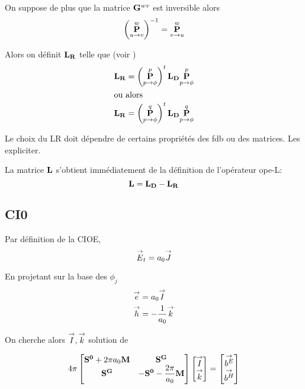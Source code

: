    \begin{prop}
      On suppose de plus que la matrice \(\mG{w}{v}\) est inversible alors
      \begin{equation}
        \left(\mP{u}{v}{w}\right)^{-1} = \mP{v}{u}{w}
      \end{equation}
    \end{prop}

    Alors on définit \(\mLR\) telle que (voir \cite{stupfel_implementation_2015})
    \begin{align}
      \mLR & = \left(\mP{p}{\phi}{p}\right)^t\mLD\mP{p}{\phi}{p} \\
      \intertext{ou alors}
      \mLR & = \left(\mP{p}{\phi}{q}\right)^t\mLD\mP{p}{\phi}{q} 
    \end{align}

    \begin{TODO}
      Le choix du LR doit dépendre de certains propriétés des fdb ou des matrices. Les expliciter.
    \end{TODO}

    La matrice \(\mL\) s’obtient immédiatement de la définition de l'opérateur \gls{ope-L}: 
    \begin{equation}
      \mL = \mLD - \mLR
    \end{equation}
        
    \subsection{CI0}
      Par définition de la CIOE,
      \begin{equation}
          \vE_t = a_0 \vJ
      \end{equation}

      En projetant sur la base des \(\phi_j\)
      \begin{align}
        \vect{e} &= a_0 \vect{I} \\
        \vect{h} &= -\frac{1}{a_0} \vect{k}
      \end{align}

    On cherche alors \(\vect{I},\vect{k}\) solution de 

    \begin{equation}
      4\pi
      \begin{bmatrix}
        \mat{S^0}+2\pi a_0 \mM & \mat{S^G} \\
        \mat{S^G} & -\mat{S^0} - \frac{2\pi}{a_0}\mM
      \end{bmatrix}
      \begin{bmatrix}
        \vect{I}\\
        \vect{k}
      \end{bmatrix}
      =
      \begin{bmatrix}
        \vect{b^E}\\
        \vect{b^H}
      \end{bmatrix}     
    \end{equation}


